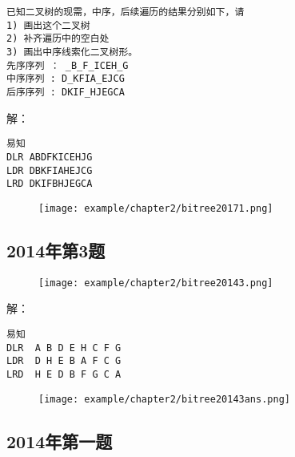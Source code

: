 \begin{lstlisting}[basicstyle=\small\ttfamily, caption={}, numbers=none]
已知二叉树的现需，中序，后续遍历的结果分别如下，请 
1) 画出这个二叉树
2) 补齐遍历中的空白处
3) 画出中序线索化二叉树形。
先序序列 ： _B_F_ICEH_G
中序序列 : D_KFIA_EJCG
后序序列 : DKIF_HJEGCA
\end{lstlisting}

解：
\begin{lstlisting}[basicstyle=\small\ttfamily, caption={}, numbers=none]
易知
DLR ABDFKICEHJG
LDR DBKFIAHEJCG
LRD DKIFBHJEGCA
\end{lstlisting}

\begin{figure}[H]
	\centering  %
	\texttt{[image: example/chapter2/bitree20171.png]}
\end{figure}


\subsection{2014年第3题}


\begin{figure}[H]
	\centering  %
	\texttt{[image: example/chapter2/bitree20143.png]}
\end{figure}

解：

\begin{lstlisting}[basicstyle=\small\ttfamily, caption={}, numbers=none]
易知
DLR  A B D E H C F G
LDR  D H E B A F C G
LRD  H E D B F G C A
\end{lstlisting}

\begin{figure}[H]
	\centering  %
	\texttt{[image: example/chapter2/bitree20143ans.png]}
\end{figure}


\subsection{2014年第一题}

